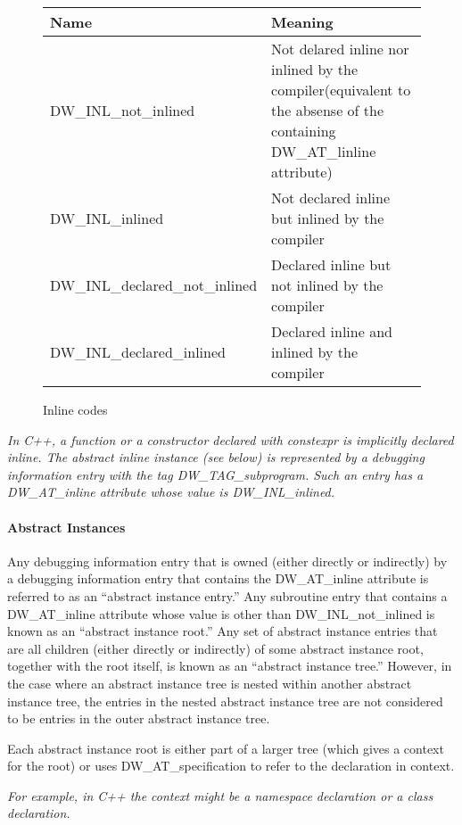 \begin{figure}[here]
\centering
\caption{Inline codes}
\label{fig:inlinecodes}
\begin{tabular}{lp{9cm}}
Name&Meaning\\ \hline
DW\_INL\_not\_inlined & Not delared inline nor inlined by the
  compiler(equivalent to the absense of the containing
  DW\-\_AT\-\_linline attribute) \\
DW\_INL\_inlined & Not declared inline but inlined by the compiler \\
DW\_INL\_declared\_not\_inlined & Declared inline but 
  not inlined by the compiler \\
DW\_INL\_declared\_inlined & Declared inline and inlined by the compiler \\
\end{tabular}
\end{figure}

\textit{In C++, a function or a constructor declared with
constexpr is implicitly declared inline. The abstract inline
instance (see below) is represented by a debugging information
entry with the tag DW\_TAG\_subprogram. Such an entry has a
DW\_AT\_inline attribute whose value is DW\_INL\_inlined.}


\paragraph{Abstract Instances}
\label{chap:abstractinstances}
Any debugging information entry that is owned (either
directly or indirectly) by a debugging information entry
that contains the DW\_AT\_inline attribute is referred to
as an “abstract instance entry.” Any subroutine entry
that contains a DW\_AT\_inline attribute whose value is other
than DW\_INL\_not\_inlined is known as an “abstract instance
root.” Any set of abstract instance entries that are all
children (either directly or indirectly) of some abstract
instance root, together with the root itself, is known as
an “abstract instance tree.” However, in the case where
an abstract instance tree is nested within another abstract
instance tree, the entries in the nested abstract instance
tree are not considered to be entries in the outer abstract
instance tree.

Each abstract instance root is either part of a larger
tree (which gives a context for the root) or uses
DW\_AT\_specification to refer to the declaration in context.

\textit{For example, in C++ the context might be a namespace
declaration or a class declaration.}

